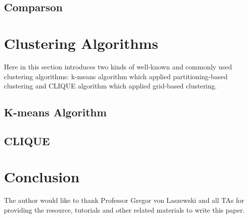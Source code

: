 \documentclass[sigconf]{acmart}
\begin{document}
\subsection{Comparson}

\section{Clustering Algorithms}

Here in this section introduces two kinds of well-known and commonly used clustering algorithms: k-means algorithm which applied partitioning-based clustering and CLIQUE algorithm which applied grid-based clustering.

\subsection{K-means Algorithm}



\subsection{CLIQUE}

\section{Conclusion}


\begin{acks}

The author would like to thank Professor Gregor von Laszewski and all TAs for providing the resource, tutorials and other related materials to write this paper.

\end{acks}




% 
\end{document}
